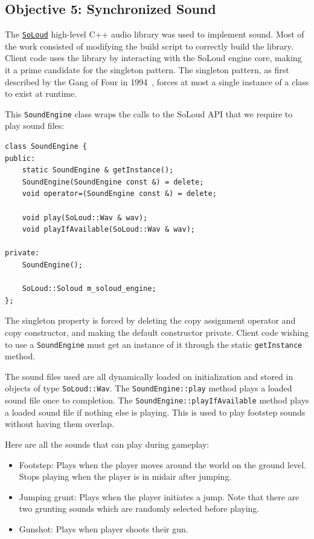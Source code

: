 \documentclass {article}
\begin{document}
\subsection{Objective 5: Synchronized Sound}
The \href{https://solhsa.com/soloud/}{\texttt{SoLoud}} high-level C++ audio library was used to implement sound. Most of the work consisted of modifying the build script to correctly build the library. Client code uses the library by interacting with the SoLoud engine core, making it a prime candidate for the singleton pattern. The singleton pattern, as first described by the Gang of Four in 1994~\cite{gofsingleton}, forces at most a single instance of a class to exist at runtime.

This \texttt{SoundEngine} class wraps the calls to the SoLoud API that we require to play sound files:
\begin{verbatim}
class SoundEngine {
public:
    static SoundEngine & getInstance();
    SoundEngine(SoundEngine const &) = delete;
    void operator=(SoundEngine const &) = delete;

    void play(SoLoud::Wav & wav);
    void playIfAvailable(SoLoud::Wav & wav);

private:
    SoundEngine();

    SoLoud::Soloud m_soloud_engine;
};
\end{verbatim}

The singleton property is forced by deleting the copy assignment operator and copy constructor, and making the default constructor private. Client code wishing to use a \texttt{SoundEngine} must get an instance of it through the static \texttt{getInstance} method.

The sound files used are all dynamically loaded on initialization and stored in objects of type \texttt{SoLoud::Wav}. The \texttt{SoundEngine::play} method plays a loaded sound file once to completion. The \texttt{SoundEngine::playIfAvailable} method plays a loaded sound file if nothing else is playing. This is used to play footstep sounds without having them overlap.

Here are all the sounds that can play during gameplay:
\begin{itemize}
  \item Footstep: Plays when the player moves around the world on the ground level. Stops playing when the player is in midair after jumping.
  \item Jumping grunt: Plays when the player initiates a jump. Note that there are two grunting sounds which are randomly selected before playing.
  \item Gunshot: Plays when player shoots their gun.
\end{itemize}
\end{document}

